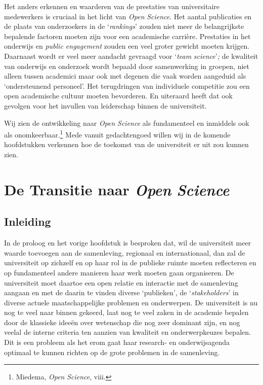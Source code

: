 \documentclass[smallauthor, chapterhaspagenum, nochapterinheader, pagenuminheader,  bigchapnum,medium2, tocpages,  garamond, titleinheader]{jote-book}
\begin{document}
	Het anders erkennen en waarderen van de prestaties van universitaire medewerkers is cruciaal in het licht van \emph{Open }\emph{Science}. Het aantal publicaties en de plaats van onderzoekers in de ‘\emph{rankings}' zouden niet meer de belangrijkste bepalende factoren moeten zijn voor een academische carrière. Prestaties in het onderwijs en \emph{public engagement} zouden een veel groter gewicht moeten krijgen. Daarnaast wordt er veel meer aandacht gevraagd voor ‘\emph{team}\emph{ }\emph{science}'\emph{; }de kwaliteit van onderwijs en onderzoek wordt bepaald door samenwerking in groepen, niet alleen tussen academici maar ook met degenen die vaak worden aangeduid als ‘ondersteunend personeel'. Het terugdringen van individuele competitie zou een open academische cultuur moeten bevorderen. En uiteraard heeft dat ook gevolgen voor het invullen van leiderschap binnen de universiteit.







	Wij zien de ontwikkeling naar \emph{Open }\emph{Science} als fundamenteel en inmiddels ook als onomkeerbaar.\footnote{Miedema, \emph{Open }\emph{Science}, viii.} Mede vanuit gedachtengoed willen wij in de komende hoofdstukken verkennen hoe de toekomst van de universiteit er uit zou kunnen zien.







	\chapter{De Transitie naar \emph{Open }\emph{Science} }



	\section{Inleiding }



	In de proloog en het vorige hoofdstuk is besproken dat, wil de universiteit meer waarde toevoegen aan de samenleving, regionaal en internationaal, dan zal de universiteit op zichzelf en op haar rol in de publieke ruimte moeten reflecteren en op fundamenteel andere manieren haar werk moeten gaan organiseren. De universiteit moet daartoe een open relatie en interactie met de samenleving aangaan en met de daarin te vinden diverse ‘publieken', de ‘\emph{stakeholders}' in diverse actuele maatschappelijke problemen en onderwerpen. De universiteit is nu nog te veel naar binnen gekeerd, laat nog te veel zaken in de academie bepalen door de klassieke ideeën over wetenschap die nog zeer dominant zijn, en nog veelal de interne criteria ten aanzien van kwaliteit en onderwerpkeuzes bepalen. Dit is een probleem als het erom gaat haar research- en onderwijsagenda optimaal te kunnen richten op de grote problemen in de samenleving.
\end{document}
